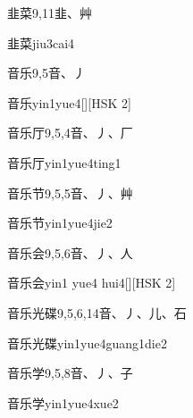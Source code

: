 \begin{entry}{韭菜}{9,11}{⾲、⾋}
  \begin{phonetics}{韭菜}{jiu3cai4}
  \end{phonetics}
\end{entry}

\begin{entry}{音乐}{9,5}{⾳、⼃}
  \begin{phonetics}{音乐}{yin1yue4}[][HSK 2]
  \end{phonetics}
\end{entry}

\begin{entry}{音乐厅}{9,5,4}{⾳、⼃、⼚}
  \begin{phonetics}{音乐厅}{yin1yue4ting1}
  \end{phonetics}
\end{entry}

\begin{entry}{音乐节}{9,5,5}{⾳、⼃、⾋}
  \begin{phonetics}{音乐节}{yin1yue4jie2}
  \end{phonetics}
\end{entry}

\begin{entry}{音乐会}{9,5,6}{⾳、⼃、⼈}
  \begin{phonetics}{音乐会}{yin1 yue4 hui4}[][HSK 2]
  \end{phonetics}
\end{entry}

\begin{entry}{音乐光碟}{9,5,6,14}{⾳、⼃、⼉、⽯}
  \begin{phonetics}{音乐光碟}{yin1yue4guang1die2}
  \end{phonetics}
\end{entry}

\begin{entry}{音乐学}{9,5,8}{⾳、⼃、⼦}
  \begin{phonetics}{音乐学}{yin1yue4xue2}
  \end{phonetics}
\end{entry}

